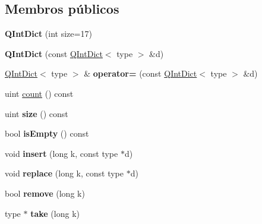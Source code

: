 \subsection*{Membros públicos}
\begin{DoxyCompactItemize}
\item 
\hypertarget{class_q_int_dict_af369c056de967873841f9f14d2ff7227}{{\bfseries Q\-Int\-Dict} (int size=17)}\label{class_q_int_dict_af369c056de967873841f9f14d2ff7227}

\item 
\hypertarget{class_q_int_dict_afd113b3e7edd0a19a2c0f3f361482de4}{{\bfseries Q\-Int\-Dict} (const \hyperlink{class_q_int_dict}{Q\-Int\-Dict}$<$ type $>$ \&d)}\label{class_q_int_dict_afd113b3e7edd0a19a2c0f3f361482de4}

\item 
\hypertarget{class_q_int_dict_ac6160b8ffb16cdff3adc64b4eab71a05}{\hyperlink{class_q_int_dict}{Q\-Int\-Dict}$<$ type $>$ \& {\bfseries operator=} (const \hyperlink{class_q_int_dict}{Q\-Int\-Dict}$<$ type $>$ \&d)}\label{class_q_int_dict_ac6160b8ffb16cdff3adc64b4eab71a05}

\item 
uint \hyperlink{class_q_int_dict_a774149fc271ebaba2aabcd183a836e8f}{count} () const 
\item 
\hypertarget{class_q_int_dict_a7e63723212bed1ca52f0fe57e58b812e}{uint {\bfseries size} () const }\label{class_q_int_dict_a7e63723212bed1ca52f0fe57e58b812e}

\item 
\hypertarget{class_q_int_dict_a479432127ee77145cc19d6a2d1590821}{bool {\bfseries is\-Empty} () const }\label{class_q_int_dict_a479432127ee77145cc19d6a2d1590821}

\item 
\hypertarget{class_q_int_dict_a82dd1e7bf3ffde20ec10b3cef70400fd}{void {\bfseries insert} (long k, const type $\ast$d)}\label{class_q_int_dict_a82dd1e7bf3ffde20ec10b3cef70400fd}

\item 
\hypertarget{class_q_int_dict_a4ff62d8ec24b9a3044cdfe38b07999a8}{void {\bfseries replace} (long k, const type $\ast$d)}\label{class_q_int_dict_a4ff62d8ec24b9a3044cdfe38b07999a8}

\item 
\hypertarget{class_q_int_dict_a4381099d2a71b615cc52639294187030}{bool {\bfseries remove} (long k)}\label{class_q_int_dict_a4381099d2a71b615cc52639294187030}

\item 
\hypertarget{class_q_int_dict_aa7257b515ccfa15737ac4faac228a631}{type $\ast$ {\bfseries take} (long k)}\label{class_q_int_dict_aa7257b515ccfa15737ac4faac228a631}


\end{DoxyCompactItemize}
